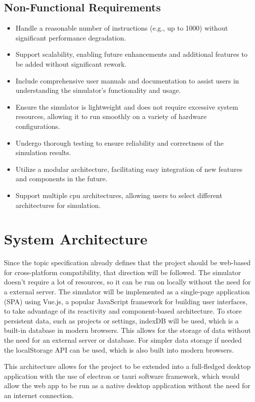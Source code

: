 \subsection{Non-Functional Requirements}
\begin{itemize}
    \item Handle a reasonable number of instructions (e.g., up to 1000) without significant performance degradation.
    \item Support scalability, enabling future enhancements and additional features to be added without significant rework.
    \item Include comprehensive user manuals and documentation to assist users in understanding the simulator's functionality and usage.
    \item Ensure the simulator is lightweight and does not require excessive system resources, allowing it to run smoothly on a variety of hardware configurations.
    \item Undergo thorough testing to ensure reliability and correctness of the simulation results.
    \item Utilize a modular architecture, facilitating easy integration of new features and components in the future.
    \item Support multiple cpu architectures, allowing users to select different architectures for simulation.
\end{itemize}

\section{System Architecture}

Since the topic specification already defines that the project should be web-based for cross-platform compatibility, that direction will be followed. The simulator doesn't require a lot of resources, so it can be run on locally without the need for a external server. The simulator will be implemented as a single-page application (SPA) using Vue.js, a popular JavaScript framework for building user interfaces, to take advantage of its reactivity and component-based architecture. To store persistent data, such as projects or settings, indexDB will be used, which is a built-in database in modern browsers. This allows for the storage of data without the need for an external server or database. For simpler data storage if needed the localStorage API can be used, which is also built into modern browsers. 

This architecture allows for the project to be extended into a full-fledged desktop application with the use of electron or tauri software framework, which would allow the web app to be run as a native desktop application without the need for an internet connection. 

